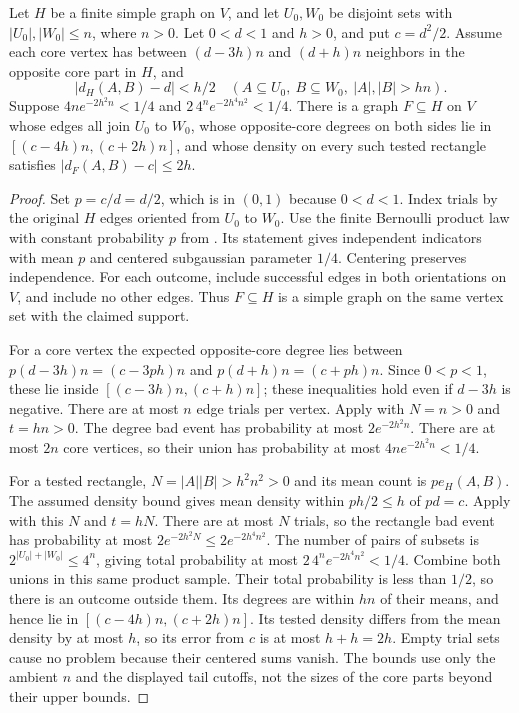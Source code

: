 \begin{lemma}
Let $H$ be a finite simple graph on $V$, and let $U_0,W_0$
be disjoint sets with $|U_0|,|W_0|\leq n$, where $n>0$.
Let $0<d<1$ and $h>0$, and put $c=d^2/2$.
Assume each core vertex has between $(d-3h)n$ and $(d+h)n$
neighbors in the opposite core part in $H$, and
\[
|d_H(A,B)-d|<h/2\quad
(A\subseteq U_0,\ B\subseteq W_0,\ |A|,|B|>hn).
\]
Suppose $4n e^{-2h^2n}<1/4$ and
$2\,4^n e^{-2h^4n^2}<1/4$.
There is a graph $F\subseteq H$ on $V$ whose edges all join
$U_0$ to $W_0$, whose opposite-core degrees on both sides lie in
$[(c-4h)n,(c+2h)n]$, and whose density on every such tested
rectangle satisfies $|d_F(A,B)-c|\leq2h$.
\end{lemma}
\begin{proof}
Set $p=c/d=d/2$, which is in $(0,1)$ because $0<d<1$.
Index trials by the original $H$ edges oriented from $U_0$ to
$W_0$. Use the finite Bernoulli product law with constant probability
$p$ from . Its statement
gives independent indicators with mean $p$ and centered
subgaussian parameter $1/4$. Centering preserves independence.
For each outcome, include successful edges in both orientations
on $V$, and include no other edges. Thus $F\subseteq H$ is a
simple graph on the same vertex set with the claimed support.

For a core vertex the expected opposite-core degree lies between
$p(d-3h)n=(c-3ph)n$ and $p(d+h)n=(c+ph)n$.
Since $0<p<1$, these lie inside $[(c-3h)n,(c+h)n]$;
these inequalities hold even if $d-3h$ is negative.
There are at most $n$ edge trials per vertex. Apply
 with $N=n>0$ and
$t=hn>0$. The degree bad event has probability at most
$2e^{-2h^2n}$. There are at most $2n$ core vertices, so their
union has probability at most $4ne^{-2h^2n}<1/4$.

For a tested rectangle, $N=|A||B|>h^2n^2>0$ and its mean
count is $p e_H(A,B)$. The assumed density bound gives mean
density within $ph/2\leq h$ of $pd=c$.
Apply  with this $N$
and $t=hN$. There are at most $N$ trials, so the rectangle bad
event has probability at most
$2e^{-2h^2N}\leq2e^{-2h^4n^2}$.
The number of pairs of subsets is
$2^{|U_0|+|W_0|}\leq4^n$, giving total probability at most
$2\,4^n e^{-2h^4n^2}<1/4$.
Combine both unions in this same product sample. Their total
probability is less than $1/2$, so there is an outcome outside
them. Its degrees are within $hn$ of their means, and hence
lie in $[(c-4h)n,(c+2h)n]$. Its tested density differs from
the mean density by at most $h$, so its error from $c$ is at
most $h+h=2h$. Empty trial sets cause no problem because
their centered sums vanish. The bounds use only the ambient
$n$ and the displayed tail cutoffs, not the sizes of the core
parts beyond their upper bounds.
\end{proof}
